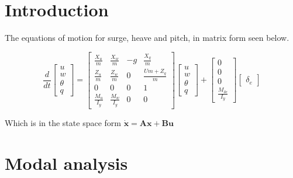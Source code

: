 \documentclass{article}
\begin{document}
\title{}
\author{lwp26}
\date{Feburary 2025}
\maketitle

\section{Introduction}

The equations of motion for surge, heave and pitch, in matrix form seen below.

\begin{equation}
  \frac{d}{dt}\left[\begin{matrix}u\\w\\\theta\\q\end{matrix}\right] = \left[\begin{matrix}\frac{X_{u}}{m} & \frac{X_{w}}{m} & - g & \frac{X_{q}}{m}\\\frac{Z_{u}}{m} & \frac{Z_{w}}{m} & 0 & \frac{U m + Z_{q}}{m}\\0 & 0 & 0 & 1\\\frac{M_{u}}{I_{y}} & \frac{M_{w}}{I_{y}} & 0 & 0\end{matrix}\right]
  \left[\begin{matrix}u\\w\\\theta\\q\end{matrix}\right] + 
  \left[\begin{matrix}0\\0\\0\\\frac{M_{\delta e}}{I_{y}}\end{matrix}\right]
  \left[\begin{matrix}\delta_{e}\end{matrix}\right]
\end{equation}

Which is in the state space form $\dot{\mathbf{x}} = \mathbf{Ax+Bu}$

\section{Modal analysis}
\end{document}
